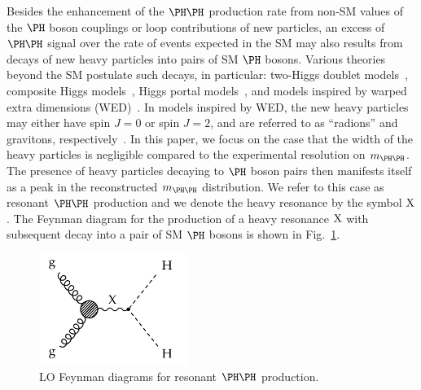 Besides the enhancement of the $\HH$ production rate from non-SM values of the $\PHiggs$ boson couplings or loop contributions of new particles,
an excess of $\HH$ signal over the rate of events expected in the SM may also results from decays of new heavy particles into pairs of SM $\PHiggs$ bosons.
Various theories beyond the SM postulate such decays, in particular:
two-Higgs doublet models~\cite{Craig:2013hca,Nhung:2013lpa},
composite Higgs models~\cite{Grober:2010yv,Contino:2010mh}, Higgs portal models~\cite{Englert:2011yb,No:2013wsa},
and models inspired by warped extra dimensions (WED)~\cite{Randall:1999ee}.
In models inspired by WED, the new heavy particles may either have spin $J=0$ or spin $J=2$,
and are referred to as ``radions'' and gravitons, respectively~\cite{Cheung:2000rw}.
In this paper, we focus on the case that the width of the heavy particles is negligible compared to the experimental resolution on $\mHH$.
The presence of heavy particles decaying to $\PHiggs$ boson pairs then manifests itself as a peak in the reconstructed $\mHH$ distribution.
We refer to this case as resonant $\HH$ production and we denote the heavy resonance by the symbol $\textrm{X}$.
The Feynman diagram for the production of a heavy resonance $\textrm{X}$ with subsequent decay into a pair of SM $\PHiggs$ bosons is shown in Fig.~\ref{fig:Feynman_ggHH_resonant}.

\begin{figure}[h!]
\setlength{\unitlength}{1mm}
\begin{center}
\includegraphics*[height=36mm]{figures/ggHH_resonant.pdf}
\end{center}
\caption{
  LO Feynman diagrams for resonant $\HH$ production.
}
\label{fig:Feynman_ggHH_resonant}
\end{figure}

